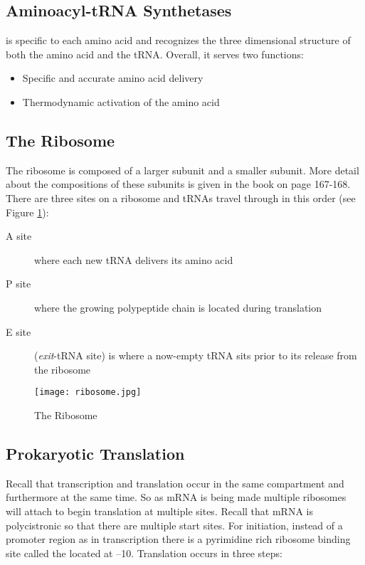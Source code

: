 \documentclass[../Bio_chemistryReview.tex]{subfiles}
\begin{document}
\subsection{Aminoacyl-tRNA Synthetases}
 is specific to each amino acid and
recognizes the three dimensional structure of both the amino acid and the tRNA.
Overall, it serves two functions:
\begin{itemize}
  \item Specific and accurate amino acid delivery
  \item Thermodynamic activation of the amino acid
\end{itemize}

\subsection{The Ribosome}
The ribosome is composed of a larger subunit and a smaller subunit. More detail
about the compositions of these subunits is given in the book on page 167-168.
There are three sites on a ribosome and tRNAs travel through in this order
(see Figure \ref{fig:rib}):
\begin{description}
  \item[A site] where each new tRNA delivers its amino acid
  \item[P site] where the growing polypeptide chain is located during
    translation
  \item[E site] (\textit{exit}-tRNA site) is where a now-empty tRNA sits prior
    to its release from the ribosome
\end{description}
\begin{figure}[H]
  \centering
  \texttt{[image: ribosome.jpg]}
  \caption{The Ribosome}
  \label{fig:rib}
\end{figure}

\subsection{Prokaryotic Translation}
Recall that transcription and translation occur in the same compartment and
furthermore at the same time. So as mRNA is being made multiple ribosomes will
attach to begin translation at multiple sites. Recall that mRNA is polycistronic
so that there are multiple start sites.  For initiation, instead of a promoter
region as in transcription there is a pyrimidine rich ribosome binding site called
the  located at --10. Translation occurs in
three steps:
\end{document}
